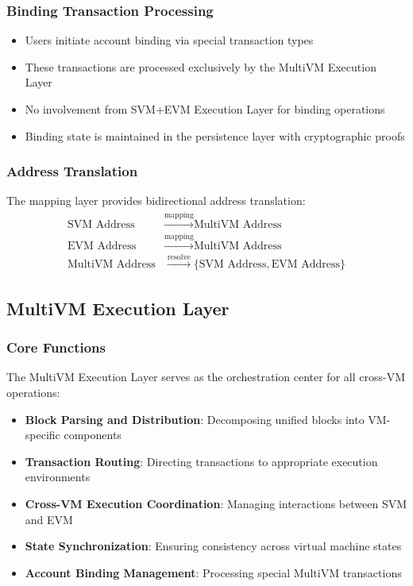 \documentclass[11pt,a4paper]{article}
\begin{document}
\subsubsection{Binding Transaction Processing}
\begin{itemize}
    \item Users initiate account binding via special transaction types
    \item These transactions are processed exclusively by the MultiVM Execution Layer
    \item No involvement from SVM+EVM Execution Layer for binding operations
    \item Binding state is maintained in the persistence layer with cryptographic proofs
\end{itemize}

\subsubsection{Address Translation}
The mapping layer provides bidirectional address translation:
\begin{align}
\text{SVM Address} &\xrightarrow{\text{mapping}} \text{MultiVM Address} \\
\text{EVM Address} &\xrightarrow{\text{mapping}} \text{MultiVM Address} \\
\text{MultiVM Address} &\xrightarrow{\text{resolve}} \{\text{SVM Address}, \text{EVM Address}\}
\end{align}

\subsection{MultiVM Execution Layer}

\subsubsection{Core Functions}
The MultiVM Execution Layer serves as the orchestration center for all cross-VM operations:

\begin{itemize}
    \item \textbf{Block Parsing and Distribution}: Decomposing unified blocks into VM-specific components
    \item \textbf{Transaction Routing}: Directing transactions to appropriate execution environments
    \item \textbf{Cross-VM Execution Coordination}: Managing interactions between SVM and EVM
    \item \textbf{State Synchronization}: Ensuring consistency across virtual machine states
    \item \textbf{Account Binding Management}: Processing special MultiVM transactions
\end{itemize}
\end{document}
